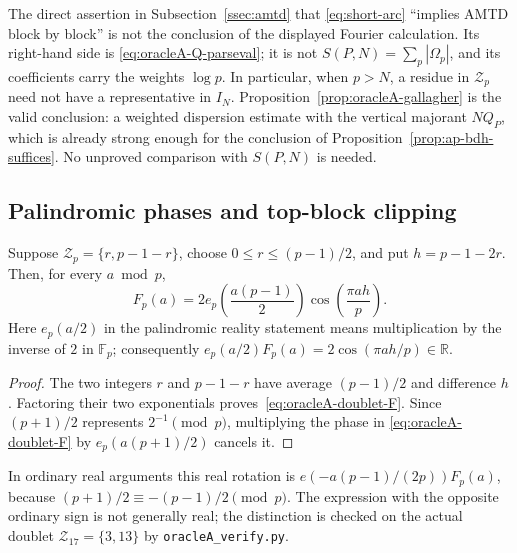 \begin{remark}
\label{rem:oracleA-weighted-not-amtd}
The direct assertion in Subsection~\ref{ssec:amtd} that
\eqref{eq:short-arc} ``implies AMTD block by block'' is not the conclusion
of the displayed Fourier calculation.  Its right-hand side is
\eqref{eq:oracleA-Q-parseval}; it is not
$S(P,N)=\sum_p|\Omega_p|$, and its coefficients carry the weights
$\log p$.  In particular, when $p>N$, a residue in $\mathcal Z_p$ need
not have a representative in $I_N$.  Proposition~\ref{prop:oracleA-gallagher}
is the valid conclusion: a weighted dispersion estimate with the vertical
majorant $NQ_P$, which is already strong enough for the conclusion of
Proposition~\ref{prop:ap-bdh-suffices}.  No unproved comparison with
$S(P,N)$ is needed.
\end{remark}

\subsection{Palindromic phases and top-block clipping}

\begin{lemma}
\label{lem:oracleA-doublet-phase}
Suppose
$\mathcal Z_p=\{r,p-1-r\}$, choose $0\leq r\leq(p-1)/2$, and put
$h=p-1-2r$.  Then, for every $a\bmod p$,
\begin{equation}
 F_p(a)=2e_p\!\left(\frac{a(p-1)}2\right)
             \cos\!\left(\frac{\pi ah}{p}\right).
 \label{eq:oracleA-doublet-F}
\end{equation}
Here $e_p(a/2)$ in the palindromic reality statement means multiplication
by the inverse of $2$ in $\mathbb F_p$; consequently
$e_p(a/2)F_p(a)=2\cos(\pi ah/p)\in\mathbb R$.
\end{lemma}

\begin{proof}
The two integers $r$ and $p-1-r$ have average $(p-1)/2$ and difference
$h$.  Factoring their two exponentials proves~\eqref{eq:oracleA-doublet-F}.
Since $(p+1)/2$ represents $2^{-1}\pmod p$, multiplying the phase in
\eqref{eq:oracleA-doublet-F} by $e_p(a(p+1)/2)$ cancels it.
\end{proof}

In ordinary real arguments this real rotation is
$e(-a(p-1)/(2p))F_p(a)$, because $(p+1)/2\equiv-(p-1)/2\pmod p$.
The expression with the opposite ordinary sign is not generally real;
the distinction is checked on the actual doublet
$\mathcal Z_{17}=\{3,13\}$ by \texttt{oracleA\_verify.py}.

